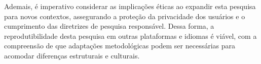 Ademais, é imperativo considerar as implicações éticas ao expandir esta pesquisa para novos contextos, assegurando a proteção da privacidade dos usuários e o cumprimento das diretrizes de pesquisa responsável. Dessa forma, a reprodutibilidade desta pesquisa em outras plataformas e idiomas é viável, com a compreensão de que adaptações metodológicas podem ser necessárias para acomodar diferenças estruturais e culturais.
